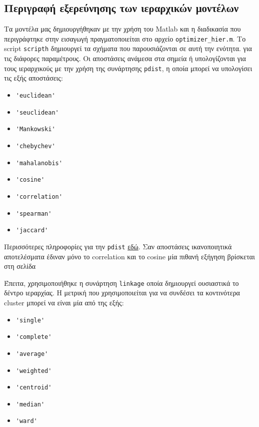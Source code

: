 \subsection{Περιγραφή εξερεύνησης των ιεραρχικών μοντέλων}
Τα μοντέλα μας δημιουργήθηκαν με την χρήση του Matlab και η διαδικασία που περιγράφτηκε στην εισαγωγή πραγματοποιείται στο αρχείο \texttt{optimizer\_hier.m}.
Το script \texttt{scripth} δημιουργεί τα σχήματα που παρουσιάζονται σε αυτή την ενότητα.
για τις διάφορες παραμέτρους. Οι αποστάσεις ανάμεσα στα σημεία ή υπολογίζονται για τους ιεραρχικούς με την χρήση της συνάρτησης \lstinline!pdist!, η οποία μπορεί να υπολογίσει τις εξής αποστάσεις:
\begin{itemize}
    \item \lstinline!'euclidean'!
    \item \lstinline!'seuclidean'!
    \item \lstinline!'Mankowski'!
    \item \lstinline!'chebychev'!
    \item \lstinline!'mahalanobis'!
    \item \lstinline!'cosine'!
    \item \lstinline!'correlation'!
    \item \lstinline!'spearman'!
    \item \lstinline!'jaccard'!
\end{itemize}

Περισσότερες πληροφορίες για την \lstinline!pdist!
\href{http://www.mathworks.com/help/stats/pdist.html}{εδώ}.
Σαν αποστάσεις ικανοποιητικά αποτελέσματα έδιναν μόνο το correlation και το 
cosine μία πιθανή εξήγηση βρίσκεται  στη σελίδα \pageref{metrics}

Έπειτα, χρησιμοποιήθηκε η συνάρτηση \lstinline!linkage! οποία δημιουργεί ουσιαστικά το δέντρο ιεραρχίας.
Η μετρική που χρησιμοποιείται για να συνδέσει τα κοντινότερα cluster μπορεί να είναι μία από της εξής:
\begin{itemize}
    \item \lstinline!'single'!
    \item \lstinline!'complete'!
    \item \lstinline!'average'!
    \item \lstinline!'weighted'!
    \item \lstinline!'centroid'!
    \item \lstinline!'median'!
    \item \lstinline!'ward'! 
\end{itemize}

